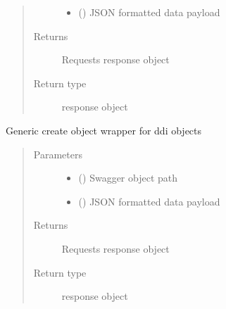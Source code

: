 \documentclass[letterpaper,10pt,english]{sphinxmanual}
\begin{document}
\begin{fulllineitems}
\begin{fulllineitems}
\begin{quote}
\begin{description}
\begin{itemize}
\item {} 
\sphinxAtStartPar
{} () \textendash{} JSON formatted data payload

\end{itemize}

\item[{Returns}] \leavevmode
\sphinxAtStartPar
Requests response object

\item[{Return type}] \leavevmode
\sphinxAtStartPar
response object

\end{description}\end{quote}

\end{fulllineitems}


\begin{fulllineitems}
\label{\detokenize{b1diagnostics-class:bloxone.b1diagnostics.update}}
\sphinxAtStartPar
Generic create object wrapper for ddi objects
\begin{quote}\begin{description}
\item[{Parameters}] \leavevmode\begin{itemize}
\item {} 
\sphinxAtStartPar
{} () \textendash{} Swagger object path

\item {} 
\sphinxAtStartPar
{} () \textendash{} JSON formatted data payload

\end{itemize}

\item[{Returns}] \leavevmode
\sphinxAtStartPar
Requests response object

\item[{Return type}] \leavevmode
\sphinxAtStartPar
response object

\end{description}\end{quote}

\end{fulllineitems}


\end{fulllineitems}
\end{document}
